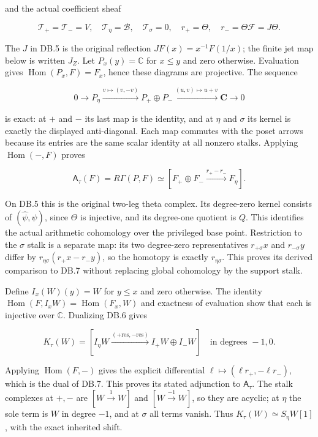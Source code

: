 and the actual coefficient sheaf

\[
\mathcal T_+=\mathcal T_-=V,\quad
\mathcal T_\eta=\mathscr B,\quad\mathcal T_\sigma=0,
\quad r_+=\Theta,\quad r_-=\Theta\mathcal F=J\Theta.
\tag{DB.5}
\]

The \(J\) in DB.5 is the original reflection \(JF(x)=x^{-1}F(1/x)\); the finite jet map below is written \(J_Z\). Let \(P_x(y)=\mathbb C\) for \(x\le y\) and zero otherwise. Evaluation gives \(\operatorname{Hom}(P_x,F)=F_x\), hence these diagrams are projective. The sequence

\[
0\to P_\eta\xrightarrow{v\mapsto(v,-v)}P_+\oplus P_-
 \xrightarrow{(u,v)\mapsto u+v}\mathbf C\to0
\tag{DB.6}
\]

is exact: at \(+\) and \(-\) its last map is the identity, and at \(\eta\) and \(\sigma\) its kernel is exactly the displayed anti-diagonal. Each map commutes with the poset arrows because its entries are the same scalar identity at all nonzero stalks. Applying \(\operatorname{Hom}(-,F)\) proves

\[
\mathsf A_\tau(F)=R\Gamma(P,F)
\simeq[F_+\oplus F_-\xrightarrow{r_+-r_-}F_\eta].
\tag{DB.7}
\]

On DB.5 this is the original two-leg theta complex. Its degree-zero kernel consists of \((\widehat\psi,\psi)\), since \(\Theta\) is injective, and its degree-one quotient is \(Q\). This identifies the actual arithmetic cohomology over the privileged base point. Restriction to the \(\sigma\) stalk is a separate map: its two degree-zero representatives \(r_{+\sigma}x\) and \(r_{-\sigma}y\) differ by \(r_{\eta\sigma}(r_+x-r_-y)\), so the homotopy is exactly \(r_{\eta\sigma}\). This proves its derived comparison to DB.7 without replacing global cohomology by the support stalk.

Define \(I_x(W)(y)=W\) for \(y\le x\) and zero otherwise. The identity \(\operatorname{Hom}(F,I_xW)=\operatorname{Hom}(F_x,W)\) and exactness of evaluation show that each is injective over \(\mathbb C\). Dualizing DB.6 gives

\[
K_\tau(W)=
[I_\eta W\xrightarrow{(+\mathrm{res},-\mathrm{res})}
 I_+W\oplus I_-W]
\quad\text{in degrees }-1,0.
\tag{DB.8}
\]

Applying \(\operatorname{Hom}(F,-)\) gives the explicit differential \(\ell\mapsto(\ell r_+,-\ell r_-)\), which is the dual of DB.7. This proves its stated adjunction to \(\mathsf A_\tau\). The stalk complexes at \(+,-\) are \([W\xrightarrow{1}W]\) and \([W\xrightarrow{-1}W]\), so they are acyclic; at \(\eta\) the sole term is \(W\) in degree \(-1\), and at \(\sigma\) all terms vanish. Thus \(K_\tau(W)\simeq S_\eta W[1]\), with the exact inherited shift.

